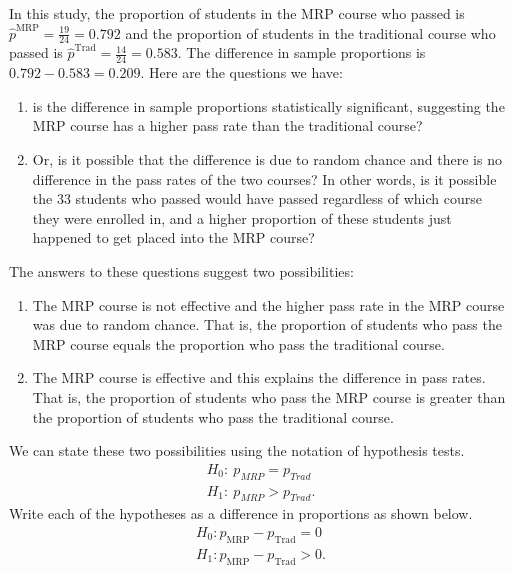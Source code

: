 \documentclass{report}
\begin{document}
    \bigbreak \noindent 
    In this study, the proportion of students in the MRP course who passed is $\hat{p}^{\text{MRP}} = \frac{19}{24} = 0.792$ and the proportion of students in the traditional course who passed is $\hat{p}^{\text{Trad}} = \frac{14}{24} = 0.583$. The difference in sample proportions is $0.792 - 0.583 = 0.209$.
    \bigbreak \noindent 
    Here are the questions we have:
    \begin{enumerate}
        \item is the difference in sample proportions statistically significant, suggesting the MRP course has a higher pass rate than the traditional course?
        \item Or, is it possible that the difference is due to random chance and there is no difference in the pass rates of the two courses? In other words, is it possible the 33 students who passed would have passed regardless of which course they were enrolled in, and a higher proportion of these students just happened to get placed into the MRP course?
    \end{enumerate}
    \bigbreak \noindent 
    The answers to these questions suggest two possibilities:
    \begin{enumerate}
        \item The MRP course is not effective and the higher pass rate in the MRP course was due to random chance. That is, the proportion of students who pass the MRP course equals the proportion who pass the traditional course.
        \item The MRP course is effective and this explains the difference in pass rates. That is, the proportion of students who pass the MRP course is greater than the proportion of students who pass the traditional course.
    \end{enumerate}
    \bigbreak \noindent 
    We can state these two possibilities using the notation of hypothesis tests.
    \begin{align*}
        H_{0}:\ p_{MRP} = p_{Trad} \\
        H_{1}:\ p_{MRP} > p_{Trad}
    .\end{align*}
    Write each of the hypotheses as a difference in proportions as shown below.
    \begin{align*}
        H_0: p_{\text{MRP}} - p_{\text{Trad}} = 0 \\
        H_1: p_{\text{MRP}} - p_{\text{Trad}} > 0
    .\end{align*}
    \bigbreak \noindent 
\end{document}
